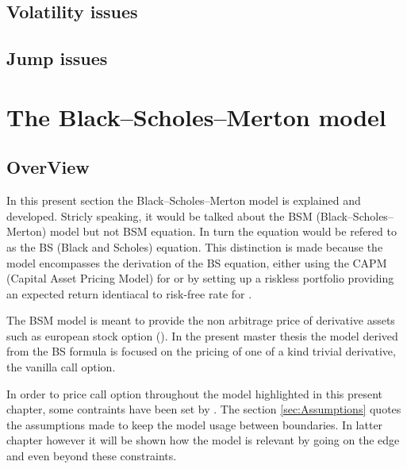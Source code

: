 \documentclass[12pt]{report}
\newcommand{\BSM}{Black--Scholes--Merton }
\begin{document}
\section{Volatility issues}
\label{sec:Volatility issues}



\section{Jump issues}
\label{sec:Jump issues}
%
%
\chapter{The \BSM model}
\label{cha:The \BSM model}


\section{OverView}
\label{sec:OverView}

In this present section the Black--Scholes--Merton model is explained and developed. Stricly speaking, it would be talked about the BSM (Black--Scholes--Merton) model but not BSM equation. In turn the equation would be refered to as the BS (Black and Scholes) equation. This distinction is made because the model encompasses the derivation of the BS equation, either using the CAPM (Capital Asset Pricing Model) for \citet{bs} or  by setting up a riskless portfolio providing an expected return identiacal to risk-free rate for \citet{merton73}.

The BSM model is meant to provide the non arbitrage price of derivative assets such as european stock option (\citet{hull}). In the present master thesis the model derived from the BS formula is focused on the pricing of one of a kind trivial derivative, the vanilla call option.

In order to price call option throughout the model highlighted in this present chapter, some contraints have been set by \citet{bs}. 
The section \ref{sec:Assumptions} quotes the assumptions made to keep the model usage between boundaries. In latter chapter however it will be shown how the model is relevant by going on the edge and even beyond these constraints.
\end{document}
